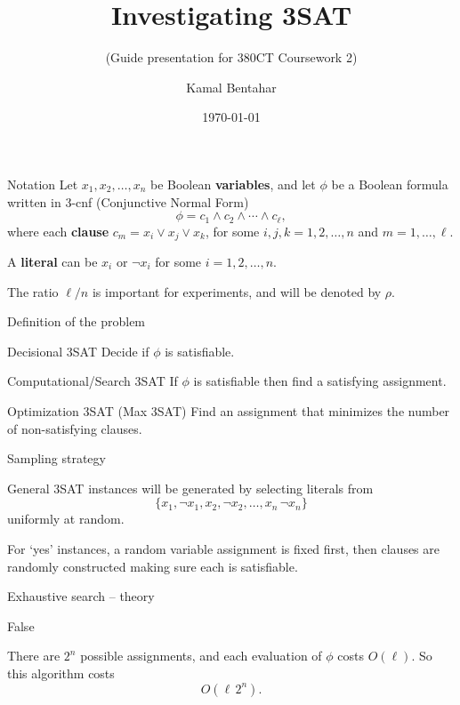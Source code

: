 \documentclass[12pt]{beamer}
\author{Kamal Bentahar}
\title{Investigating 3SAT}
\subtitle{(Guide presentation for 380CT Coursework 2)}
\date{\today}
\begin{document}
	\maketitle
	
\begin{frame}{Notation}
	Let $x_1,x_2,\ldots,x_n$ be Boolean \textbf{variables}, and let $\phi$ be a Boolean formula written in 3-cnf (Conjunctive Normal Form)
	\[
	\phi = c_1\land c_2\land \cdots \land c_\ell,
	\]
where each \textbf{clause} $c_m=x_i\lor x_j\lor x_k$, for some $i,j,k=1,2,\ldots,n$ and $m=1,\ldots,\ell$.

\vfill
A \textbf{literal} can be $x_i$ or $\lnot x_i$ for some $i=1,2,\ldots,n$.

\vfill
The ratio $\ell/n$ is important for experiments, and will be denoted by $\rho$.
\end{frame}

\begin{frame}{Definition of the problem}


	\begin{block}{Decisional 3SAT}
		Decide if $\phi$ is satisfiable.
	\end{block}

	\begin{block}{Computational/Search 3SAT}
		If $\phi$ is satisfiable then find a satisfying assignment.
	\end{block}

	\begin{block}{Optimization 3SAT (Max 3SAT)}
		Find an assignment that minimizes the number of non-satisfying clauses.
	\end{block}
\end{frame}

\begin{frame}
{Sampling strategy}

General 3SAT instances will be generated by selecting literals from
\[\{x_1, \lnot x_1, x_2, \lnot x_2, \ldots, x_n\, \lnot x_n\}\]
uniformly at random.

For `yes' instances, a random variable assignment is fixed first, then clauses are randomly constructed making sure each is satisfiable.
\end{frame}

\begin{frame}
{Exhaustive search -- theory}

\begin{algorithmic}[1]\sffamily
{}
	\EndIf
\EndFor
\State \Return False
\end{algorithmic}

\vfill

There are $2^n$ possible assignments, and each  evaluation of $\phi$ costs $O(\ell)$. So this algorithm costs \[O(\ell\, 2^n).\]
\end{frame}
\end{document}

